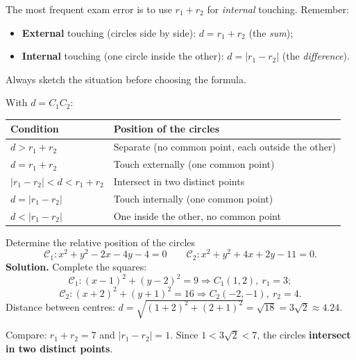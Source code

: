 \documentclass[11pt]{article}
\begin{document}
\begin{attention}
The most frequent exam error is to use $r_{1} + r_{2}$ for \emph{internal} touching. Remember:
\begin{itemize}
\item \textbf{External} touching (circles side by side): $d = r_{1} + r_{2}$ (the \emph{sum});
\item \textbf{Internal} touching (one circle inside the other): $d = |r_{1} - r_{2}|$ (the \emph{difference}).
\end{itemize}
Always sketch the situation before choosing the formula.
\end{attention}

\begin{aretenir}
With $d = C_{1}C_{2}$:
\begin{center}
\begin{tabularx}{\linewidth}{|l|X|}\hline
\rowcolor{popblueL} \textbf{Condition} & \textbf{Position of the circles} \\ \hline
$d > r_{1} + r_{2}$ & Separate (no common point, each outside the other) \\ \hline
$d = r_{1} + r_{2}$ & Touch externally (one common point) \\ \hline
$|r_{1} - r_{2}| < d < r_{1} + r_{2}$ & Intersect in two distinct points \\ \hline
$d = |r_{1} - r_{2}|$ & Touch internally (one common point) \\ \hline
$d < |r_{1} - r_{2}|$ & One inside the other, no common point \\ \hline
\end{tabularx}
\end{center}
\end{aretenir}

\begin{exoresolu}
Determine the relative position of the circles
\[ \mathscr{C}_{1}: x^{2} + y^{2} - 2x - 4y - 4 = 0 \qquad \mathscr{C}_{2}: x^{2} + y^{2} + 4x + 2y - 11 = 0. \]
\tcblower
\textbf{Solution.} Complete the squares:
\[ \mathscr{C}_{1}: (x-1)^{2} + (y-2)^{2} = 9 \Rightarrow C_{1}(1,2),\ r_{1} = 3; \]
\[ \mathscr{C}_{2}: (x+2)^{2} + (y+1)^{2} = 16 \Rightarrow C_{2}(-2,-1),\ r_{2} = 4. \]
Distance between centres: $d = \sqrt{(1+2)^{2} + (2+1)^{2}} = \sqrt{18} = 3\sqrt{2} \approx 4.24$.

Compare: $r_{1} + r_{2} = 7$ and $|r_{1} - r_{2}| = 1$. Since $1 < 3\sqrt{2} < 7$, the circles \textbf{intersect in two distinct points}.
\end{exoresolu}
\end{document}
